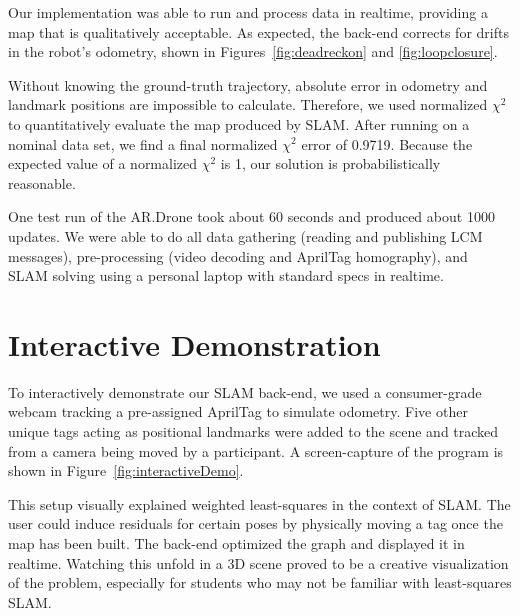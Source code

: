 \documentclass[conference]{IEEEtran}
\begin{document}
Our implementation was able to run and process data in realtime, providing a map that is
qualitatively acceptable.  As expected, the back-end corrects for drifts in the robot's
odometry, shown in Figures~\ref{fig:deadreckon} and \ref{fig:loopclosure}.


Without knowing the ground-truth trajectory, absolute error in odometry and landmark
positions are impossible to calculate.  Therefore, we used normalized $\chi^2$ to
quantitatively evaluate the map produced by \ac{SLAM}.  After running on a nominal data
set, we find a final normalized $\chi^2$ error of 0.9719.  Because the expected
value of a normalized $\chi^2$ is 1, our solution is probabilistically reasonable.

One test run of the AR.Drone took about 60 seconds and produced about 1000 updates. We
were able to do all data gathering (reading and publishing LCM messages), pre-processing
(video decoding and AprilTag homography), and \ac{SLAM} solving using a personal laptop
with standard specs in realtime.

\section{Interactive Demonstration}

To interactively demonstrate our \ac{SLAM} back-end, we used a consumer-grade webcam
tracking a pre-assigned AprilTag to simulate odometry. Five other unique tags acting as
positional landmarks were added to the scene and tracked from a camera being moved by a
participant. A screen-capture of the program is shown in Figure~\ref{fig:interactiveDemo}.

This setup visually explained weighted least-squares in the context of \ac{SLAM}.  The
user could induce residuals for certain poses by physically moving a tag once the map has
been built.  The back-end optimized the graph and displayed it in realtime.  Watching this
unfold in a 3D scene proved to be a creative visualization of the problem,
especially for students who may not be familiar with least-squares SLAM.
\end{document}
